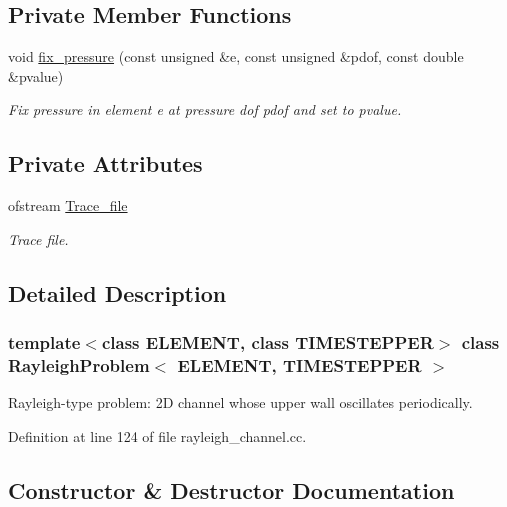 \subsection*{Private Member Functions}
\begin{DoxyCompactItemize}
\item 
void \hyperlink{classRayleighProblem_ab977f10be3d0cb8f885bff340b64e4ce}{fix\+\_\+pressure} (const unsigned \&e, const unsigned \&pdof, const double \&pvalue)
\begin{DoxyCompactList}\small\item\em Fix pressure in element e at pressure dof pdof and set to pvalue. \end{DoxyCompactList}\end{DoxyCompactItemize}
\subsection*{Private Attributes}
\begin{DoxyCompactItemize}
\item 
ofstream \hyperlink{classRayleighProblem_a0fc091c88474779c0e3a474d5c8169f4}{Trace\+\_\+file}
\begin{DoxyCompactList}\small\item\em Trace file. \end{DoxyCompactList}\end{DoxyCompactItemize}


\subsection{Detailed Description}
\subsubsection*{template$<$class E\+L\+E\+M\+E\+NT, class T\+I\+M\+E\+S\+T\+E\+P\+P\+ER$>$\newline
class Rayleigh\+Problem$<$ E\+L\+E\+M\+E\+N\+T, T\+I\+M\+E\+S\+T\+E\+P\+P\+E\+R $>$}

Rayleigh-\/type problem\+: 2D channel whose upper wall oscillates periodically. 

Definition at line 124 of file rayleigh\+\_\+channel.\+cc.



\subsection{Constructor \& Destructor Documentation}
\mbox{\label{classRayleighProblem_a53aeda7918553889b3fa0dd70cdb30f1}} 
